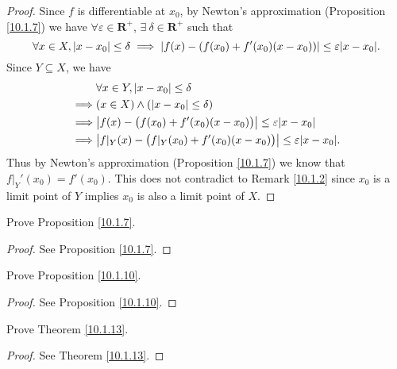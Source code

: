 \begin{proof}
    Since \(f\) is differentiable at \(x_0\), by Newton's approximation (Proposition \ref{10.1.7}) we have \(\forall \varepsilon \in \mathbf{R}^+\), \(\exists\ \delta \in \mathbf{R}^+\) such that
    \[
        \forall x \in X, \abs*{x - x_0} \leq \delta \implies \abs*{f(x) - (f(x_0) + f'(x_0)(x - x_0))} \leq \varepsilon \abs*{x - x_0}.
    \]
    Since \(Y \subseteq X\), we have
    \begin{align*}
                 & \forall x \in Y, \abs*{x - x_0} \leq \delta                                              \\
        \implies & (x \in X) \land (\abs*{x - x_0} \leq \delta)                                             \\
        \implies & \abs*{f(x) - \big(f(x_0) + f'(x_0)(x - x_0)\big)} \leq \varepsilon \abs*{x - x_0}        \\
        \implies & \abs*{f|_Y(x) - \big(f|_Y(x_0) + f'(x_0)(x - x_0)\big)} \leq \varepsilon \abs*{x - x_0}.
    \end{align*}
    Thus by Newton's approximation (Proposition \ref{10.1.7}) we know that \(f|_Y'(x_0) = f'(x_0)\).
    This does not contradict to Remark \ref{10.1.2} since \(x_0\) is a limit point of \(Y\) implies \(x_0\) is also a limit point of \(X\).
\end{proof}

\begin{exercise}\label{ex 10.1.2}
    Prove Proposition \ref{10.1.7}.
\end{exercise}

\begin{proof}
    See Proposition \ref{10.1.7}.
\end{proof}

\begin{exercise}\label{ex 10.1.3}
    Prove Proposition \ref{10.1.10}.
\end{exercise}

\begin{proof}
    See Proposition \ref{10.1.10}.
\end{proof}

\begin{exercise}\label{ex 10.1.4}
    Prove Theorem \ref{10.1.13}.
\end{exercise}

\begin{proof}
    See Theorem \ref{10.1.13}.
\end{proof}


